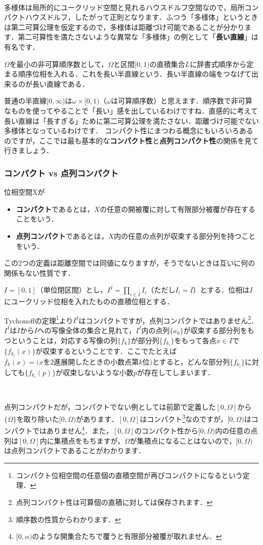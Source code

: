 　\par
多様体は局所的にユークリッド空間と見れるハウスドルフ空間なので，局所コンパクトハウスドルフ，したがって正則となります．ふつう「多様体」というときは第二可算公理を仮定するので，多様体は距離づけ可能であることが分かります．第二可算性を満たさないような異常な「多様体」の例として「{\bf 長い直線}」は有名です．
\begin{exm}[長い直線]
$\Omega$を最小の非可算順序数として，$\Omega$と区間$[0,1)$の直積集合$L$に辞書式順序から定まる順序位相を入れる．これを長い半直線という．長い半直線の端をつなげて出来るのが長い直線である．
\end{exm}
普通の半直線$[0,\infty)$は$\omega\times[0,1)$（$\omega$は可算順序数）と思えます．順序数で非可算なものを使ってやることで「長い」感を出しているわけですね．直感的に考えて長い直線は「長すぎる」ために第二可算公理を満たさない．距離づけ可能でない多様体となっているわけです．
コンパクト性にまつわる概念にもいろいろあるのですが，ここでは最も基本的な{\bf コンパクト性}と{\bf 点列コンパクト性}の関係を見て行きましょう．
\subsubsection{コンパクト vs 点列コンパクト}
\begin{defm}
位相空間Xが
\begin{itemize}
\item {\bf コンパクト}であるとは，$X$の任意の開被覆に対して有限部分被覆が存在することをいう．
\item {\bf 点列コンパクト}であるとは，$X$内の任意の点列が収束する部分列を持つことをいう．
\end{itemize}
\end{defm}
この2つの定義は距離空間では同値になりますが，そうでないときは互いに何の関係もない性質です．
\begin{exm}[$I^I$]
$I=[0,1]$（単位閉区間）とし，$I^I=\displaystyle \prod_{i\in I}I_i$（ただし$I_i=I$）とする．位相は$I$にユークリッド位相を入れたものの直積位相とする．
\end{exm}
Tychonoffの定理\footnote{コンパクト位相空間の任意個の直積空間が再びコンパクトになるという定理．}より$I^I$はコンパクトですが，点列コンパクトではありません\footnote{点列コンパクト性は可算個の直積に対しては保存されます．}．$I^I$は$I$から$I$への写像全体の集合と見れて，$I^I$内の点列$\{a_k\}$が収束する部分列をもつということは，対応する写像の列$\{f_k\}$が部分列$\{f_{k_i}\}$をもって各点$x\in I$で$\{ f_{k_i}(x) \}$が収束するということです．ここでたとえば$f_k(x)=(x\text{を2進展開したときの小数点第}k\text{位)}$とすると，どんな部分列$\{f_{k_i}\}$に対しても$\{f_{k_i}(p)\}$が収束しないような小数$p$が存在してしまいます．\par 
　\par
点列コンパクトだが，コンパクトでない例としては前節で定義した$[0,\Omega]$から$\{\Omega\}$を取り除いた$[0,\Omega)$があります．$[0,\Omega]$はコンパクト\footnote{順序数の性質からわかります．}なのですが，$[0,\Omega)$はコンパクトではありません\footnote{$[0,\alpha)$のような開集合たちで覆うと有限部分被覆が取れません．}．また，$[0,\Omega]$のコンパクト性から$[0,\Omega)$内の任意の点列は$[0,\Omega]$内に集積点をもちますが，$\Omega$が集積点になることはないので，$[0,\Omega)$は点列コンパクトであることがわかります．

